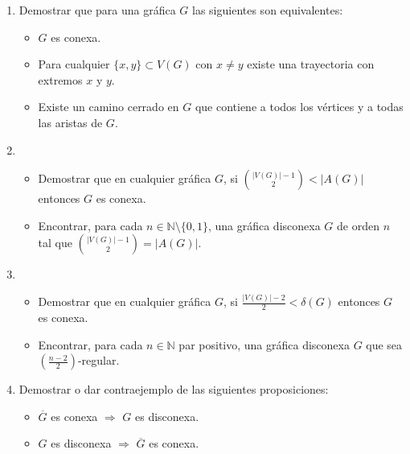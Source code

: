 \documentclass[10pt]{report}
\numberwithin{section}{chapter}
\newcommand{\N}{\mathbb N}
\begin{document}
\begin{enumerate}
\item Demostrar que para una gráfica $G$ las siguientes son equivalentes:
\begin{itemize}
\item $G$ es conexa.
\item Para cualquier $\{x,y\} \subset V(G)$ con $x \neq y$ existe una trayectoria con extremos $x$ y $y$.
\item Existe un camino cerrado en $G$ que contiene a todos los vértices y a todas las aristas de $G$.
\end{itemize}

\item
\begin{itemize}
\item Demostrar que en cualquier gráfica $G$, si ${|V(G)| -1 \choose 2} < |A(G)|$ entonces $G$ es conexa.
\item Encontrar, para cada $n \in \N \setminus \{0,1\}$, una gráfica disconexa $G$ de orden $n$ tal que ${|V(G)| -1 \choose 2} = |A(G)|$.
\end{itemize}

\item
\begin{itemize}
\item Demostrar que en cualquier gráfica $G$, si $\frac{|V(G)|-2}{2} < \delta(G)$ entonces $G$ es conexa.
\item Encontrar, para cada $n \in \N$ par positivo, una gráfica disconexa $G$ que sea $(\frac{n-2}{2})$-regular.
\end{itemize}

\item Demostrar o dar contraejemplo de las siguientes proposiciones:
\begin{itemize}
\item $\overline{G}$ es conexa $\Rightarrow$ $G$ es disconexa. 
\item $G$ es disconexa $\Rightarrow$ $\overline{G}$ es conexa. 
\end{itemize}



\end{enumerate}
\end{document}
